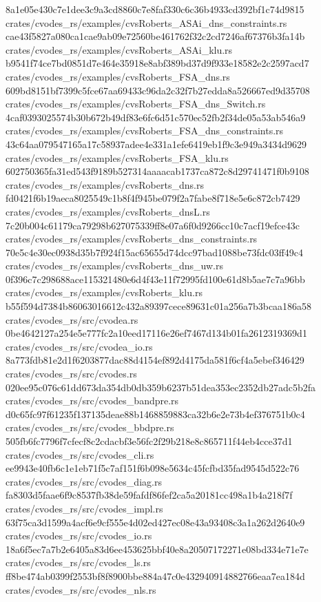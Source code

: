 \documentclass[
  10pt,
]{article}
\newenvironment{Shaded}{}{}
\newcommand{\NormalTok}[1]{#1}
\begin{document}
\begin{Shaded}
\begin{Highlighting}[]
\NormalTok{8a1e05e430c7e1dee3c9a3cd8860c7e8faf330c6c36b4933cd392bf1c74d9815  crates/cvodes\_rs/examples/cvsRoberts\_ASAi\_dns\_constraints.rs}
\NormalTok{cae43f5827a080ca1cae9ab09e72560be461762f32c2cd7246af67376b3fa14b  crates/cvodes\_rs/examples/cvsRoberts\_ASAi\_klu.rs}
\NormalTok{b9541f74ce7bd0851d7e464e35918e8abf389bd37d9f933e18582e2c2597acd7  crates/cvodes\_rs/examples/cvsRoberts\_FSA\_dns.rs}
\NormalTok{609bd8151bf7399c5fce67aa69433c96da2c32f7b27edda8a526667ed9d35708  crates/cvodes\_rs/examples/cvsRoberts\_FSA\_dns\_Switch.rs}
\NormalTok{4caf0393025574b30b672b49df83e6fc6d51c570ec52fb2f34de05a53ab546a9  crates/cvodes\_rs/examples/cvsRoberts\_FSA\_dns\_constraints.rs}
\NormalTok{43c64aa079547165a17c58937adee4e331a1efe6419eb1f9c3e949a3434d9629  crates/cvodes\_rs/examples/cvsRoberts\_FSA\_klu.rs}
\NormalTok{602750365fa31ed543f9189b527314aaaacab1737ca872c8d29741471f0b9108  crates/cvodes\_rs/examples/cvsRoberts\_dns.rs}
\NormalTok{fd0421f6b19aeca8025549c1b8f4f945be079f2a7fabe8f718e5e6c872cb7429  crates/cvodes\_rs/examples/cvsRoberts\_dnsL.rs}
\NormalTok{7c20b004c61179ca79298b627075339ff8e07a6f0d9266cc10c7acf19efce43c  crates/cvodes\_rs/examples/cvsRoberts\_dns\_constraints.rs}
\NormalTok{70e5c4e30ec0938d35b7f924f15ac65655d74dcc97bad1088be73fdc03ff49c4  crates/cvodes\_rs/examples/cvsRoberts\_dns\_uw.rs}
\NormalTok{0f396c7c298688ace115321480e6d4f43e11f72995fd100e61d8b5ae7c7a96bb  crates/cvodes\_rs/examples/cvsRoberts\_klu.rs}
\NormalTok{b55f594d7384b86063016612c432a89397cece89631c01a256a7b3bcaa186a58  crates/cvodes\_rs/src/cvodea.rs}
\NormalTok{0be4642127a254e5e777fc2a10eed17116e26ef7467d134b01fa2612319369d1  crates/cvodes\_rs/src/cvodea\_io.rs}
\NormalTok{8a773fdb81e2d1f6203877dac88d4154ef892d4175da581f6cf4a5ebef346429  crates/cvodes\_rs/src/cvodes.rs}
\NormalTok{020ee95c076c61dd673da354db0db359b6237b51dea353ec2352db27adc5b2fa  crates/cvodes\_rs/src/cvodes\_bandpre.rs}
\NormalTok{d0c65fc97f61235f137135deae88b1468859883ca32b6e2e73b4ef376751b0c4  crates/cvodes\_rs/src/cvodes\_bbdpre.rs}
\NormalTok{505fb6fc7796f7cfecf8c2cdacbf3e56fc2f29b218e8c865711f44eb4cce37d1  crates/cvodes\_rs/src/cvodes\_cli.rs}
\NormalTok{ee9943e40fb6c1e1eb71f5c7af151f6b098e5634c45fcfbd35fad9545d522c76  crates/cvodes\_rs/src/cvodes\_diag.rs}
\NormalTok{fa8303d5faae6f9c8537fb38de59fafdf86fef2ca5a20181cc498a1b4a218f7f  crates/cvodes\_rs/src/cvodes\_impl.rs}
\NormalTok{63f75ca3d1599a4acf6e9cf555e4d02ed427ec08e43a93408c3a1a262d2640e9  crates/cvodes\_rs/src/cvodes\_io.rs}
\NormalTok{18a6f5ec7a7b2e6405a83d6ee453625bbf40e8a20507172271e08bd334e71e7e  crates/cvodes\_rs/src/cvodes\_ls.rs}
\NormalTok{ff8be474ab0399f2553bf8f8900bbe884a47c0e432940914882766eaa7ea184d  crates/cvodes\_rs/src/cvodes\_nls.rs}

\end{Highlighting}
\end{Shaded}
\end{document}
